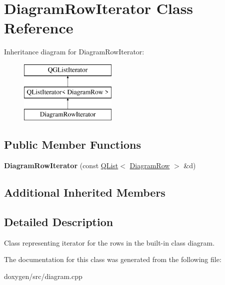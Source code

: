 \hypertarget{class_diagram_row_iterator}{}\section{Diagram\+Row\+Iterator Class Reference}
\label{class_diagram_row_iterator}
Inheritance diagram for Diagram\+Row\+Iterator\+:\begin{figure}[H]
\begin{center}
\leavevmode
\includegraphics[height=3.000000cm]{class_diagram_row_iterator}
\end{center}
\end{figure}
\subsection*{Public Member Functions}
\begin{DoxyCompactItemize}
\item 
\mbox{\label{class_diagram_row_iterator_a017a5b52dc761e5b52e4278aeab387a2}} 
{\bfseries Diagram\+Row\+Iterator} (const \mbox{\hyperlink{class_q_list}{Q\+List}}$<$ \mbox{\hyperlink{class_diagram_row}{Diagram\+Row}} $>$ \&d)
\end{DoxyCompactItemize}
\subsection*{Additional Inherited Members}


\subsection{Detailed Description}
Class representing iterator for the rows in the built-\/in class diagram. 

The documentation for this class was generated from the following file\+:\begin{DoxyCompactItemize}
\item 
doxygen/src/diagram.\+cpp\end{DoxyCompactItemize}
